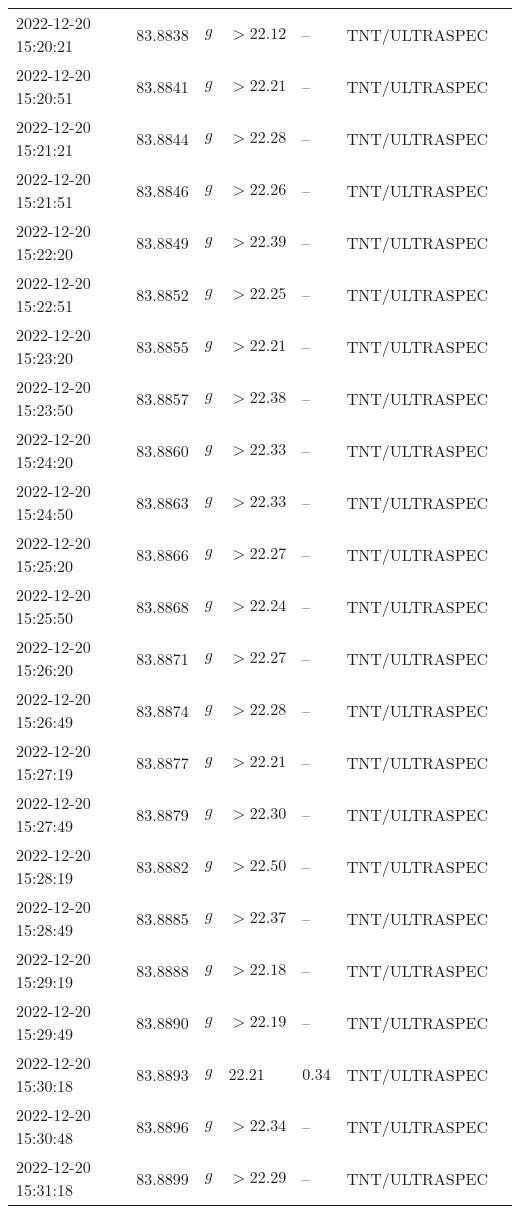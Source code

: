 \documentclass{nature_plusfigure}
\begin{document}
\begin{supplement}
\begin{center}
\begin{longtable}{lllllll}
2022-12-20 15:20:21 & 83.8838 & $g$ & $>22.12$ & -- & TNT/ULTRASPEC &  \\ 
2022-12-20 15:20:51 & 83.8841 & $g$ & $>22.21$ & -- & TNT/ULTRASPEC &  \\ 
2022-12-20 15:21:21 & 83.8844 & $g$ & $>22.28$ & -- & TNT/ULTRASPEC &  \\ 
2022-12-20 15:21:51 & 83.8846 & $g$ & $>22.26$ & -- & TNT/ULTRASPEC &  \\ 
2022-12-20 15:22:20 & 83.8849 & $g$ & $>22.39$ & -- & TNT/ULTRASPEC &  \\ 
2022-12-20 15:22:51 & 83.8852 & $g$ & $>22.25$ & -- & TNT/ULTRASPEC &  \\ 
2022-12-20 15:23:20 & 83.8855 & $g$ & $>22.21$ & -- & TNT/ULTRASPEC &  \\ 
2022-12-20 15:23:50 & 83.8857 & $g$ & $>22.38$ & -- & TNT/ULTRASPEC &  \\ 
2022-12-20 15:24:20 & 83.8860 & $g$ & $>22.33$ & -- & TNT/ULTRASPEC &  \\ 
2022-12-20 15:24:50 & 83.8863 & $g$ & $>22.33$ & -- & TNT/ULTRASPEC &  \\ 
2022-12-20 15:25:20 & 83.8866 & $g$ & $>22.27$ & -- & TNT/ULTRASPEC &  \\ 
2022-12-20 15:25:50 & 83.8868 & $g$ & $>22.24$ & -- & TNT/ULTRASPEC &  \\ 
2022-12-20 15:26:20 & 83.8871 & $g$ & $>22.27$ & -- & TNT/ULTRASPEC &  \\ 
2022-12-20 15:26:49 & 83.8874 & $g$ & $>22.28$ & -- & TNT/ULTRASPEC &  \\ 
2022-12-20 15:27:19 & 83.8877 & $g$ & $>22.21$ & -- & TNT/ULTRASPEC &  \\ 
2022-12-20 15:27:49 & 83.8879 & $g$ & $>22.30$ & -- & TNT/ULTRASPEC &  \\ 
2022-12-20 15:28:19 & 83.8882 & $g$ & $>22.50$ & -- & TNT/ULTRASPEC &  \\ 
2022-12-20 15:28:49 & 83.8885 & $g$ & $>22.37$ & -- & TNT/ULTRASPEC &  \\ 
2022-12-20 15:29:19 & 83.8888 & $g$ & $>22.18$ & -- & TNT/ULTRASPEC &  \\ 
2022-12-20 15:29:49 & 83.8890 & $g$ & $>22.19$ & -- & TNT/ULTRASPEC &  \\ 
2022-12-20 15:30:18 & 83.8893 & $g$ & $22.21$ & $0.34$ & TNT/ULTRASPEC &  \\ 
2022-12-20 15:30:48 & 83.8896 & $g$ & $>22.34$ & -- & TNT/ULTRASPEC &  \\ 
2022-12-20 15:31:18 & 83.8899 & $g$ & $>22.29$ & -- & TNT/ULTRASPEC &  \\ 

\end{longtable}
\end{center}
\end{supplement}
\end{document}
